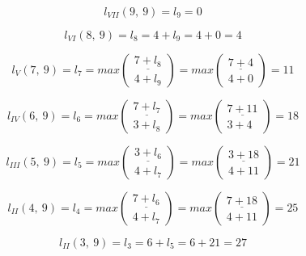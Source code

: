 \begin{equation*}
	l_{VII}(9,\ 9) = l_9 = 0
\end{equation*}

\begin{equation*}
	l_{VI}(8,\ 9) = l_8 = 4 + l_9 = 4 + 0 = 4
\end{equation*}

\begin{equation*}
	l_{V}(7,\ 9) = l_7 = max \begin{pmatrix} \underline{7 + l_8} \\ 4 + l_9 \end{pmatrix} = max \begin{pmatrix} \underline{7 + 4} \\ 4 + 0 \end{pmatrix} = 11
\end{equation*}

\begin{equation*}
	l_{IV}(6,\ 9) = l_6 = max \begin{pmatrix} \underline{7 + l_7} \\ 3 + l_8 \end{pmatrix} = max \begin{pmatrix} \underline{7 + 11} \\ 3 + 4 \end{pmatrix} = 18
\end{equation*}

\begin{equation*}
	l_{III}(5,\ 9) = l_5 = max \begin{pmatrix} \underline{3 + l_6} \\ 4 + l_7 \end{pmatrix} = max \begin{pmatrix} \underline{3 + 18} \\ 4 + 11 \end{pmatrix} = 21
\end{equation*}

\begin{equation*}
	l_{II}(4,\ 9) = l_4 = max \begin{pmatrix} \underline{7 + l_6} \\ 4 + l_7 \end{pmatrix} = max \begin{pmatrix} \underline{7 + 18} \\ 4 + 11 \end{pmatrix} = 25
\end{equation*}

\begin{equation*}
	l_{II}(3,\ 9) = l_3 = 6 + l_5 = 6 + 21 = 27
\end{equation*}

